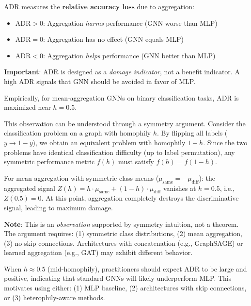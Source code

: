 \begin{remark}
\label{rem:adr_interpretation}
ADR measures the \textbf{relative accuracy loss} due to aggregation:
\begin{itemize}
    \item $\text{ADR} > 0$: Aggregation \textit{harms} performance (GNN worse than MLP)
    \item $\text{ADR} = 0$: Aggregation has no effect (GNN equals MLP)
    \item $\text{ADR} < 0$: Aggregation \textit{helps} performance (GNN better than MLP)
\end{itemize}
\textbf{Important}: ADR is designed as a \textit{damage indicator}, not a benefit indicator. A high ADR signals that GNN should be avoided in favor of MLP.
\end{remark}

\begin{observation}[ADR Peaks at $h = 0.5$]
\label{obs:adr_peak}
Empirically, for mean-aggregation GNNs on binary classification tasks, ADR is maximized near $h = 0.5$.
\end{observation}

\begin{justification}
This observation can be understood through a symmetry argument. Consider the classification problem on a graph with homophily $h$. By flipping all labels ($y \to 1-y$), we obtain an equivalent problem with homophily $1-h$. Since the two problems have identical classification difficulty (up to label permutation), any symmetric performance metric $f(h)$ must satisfy $f(h) = f(1-h)$.

For mean aggregation with symmetric class means ($\mu_{\text{same}} = -\mu_{\text{diff}}$): the aggregated signal $Z(h) = h \cdot \mu_{\text{same}} + (1-h) \cdot \mu_{\text{diff}}$ vanishes at $h = 0.5$, i.e., $Z(0.5) = 0$. At this point, aggregation completely destroys the discriminative signal, leading to maximum damage.

\textbf{Note}: This is an \textit{observation} supported by symmetry intuition, not a theorem. The argument requires: (1) symmetric class distributions, (2) mean aggregation, (3) no skip connections. Architectures with concatenation (e.g., GraphSAGE) or learned aggregation (e.g., GAT) may exhibit different behavior.
\end{justification}

\begin{remark}
\label{rem:adr_practical}
When $h \approx 0.5$ (mid-homophily), practitioners should expect ADR to be large and positive, indicating that standard GNNs will likely underperform MLP. This motivates using either: (1) MLP baseline, (2) architectures with skip connections, or (3) heterophily-aware methods.
\end{remark}

